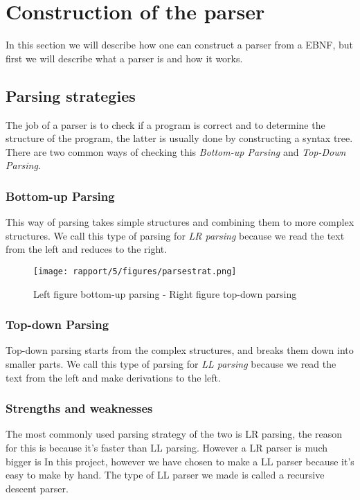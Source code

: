 \section{Construction of the parser}
	In this section we will describe how one can construct a parser from a EBNF, but first we will describe what a parser is and how it works.
	
	\subsection{Parsing strategies}
		The job of a parser is to check if a program is correct and 
		to determine the structure of the program, the latter is usually done by constructing a syntax tree.
		There are two common ways of checking this {\it Bottom-up Parsing} and {\it Top-Down Parsing}.
		
		\subsubsection*{Bottom-up Parsing}
			This way of parsing takes simple structures and combining them to more complex structures.
			We call this type of parsing for {\it LR parsing} because we read the text from the left and reduces to the right.
			\begin{figure}[H]
				\centering
				\texttt{[image: rapport/5/figures/parsestrat.png]}
				\caption{Left figure bottom-up parsing - Right figure top-down parsing}\label{fig:lrparse}
			\end{figure}
			
		\subsubsection*{Top-down Parsing}
			Top-down parsing starts from the complex structures, and breaks them down into smaller parts.
			We call this type of parsing for {\it LL parsing} because we read the text from the left and make derivations to the left.
		
		\subsubsection*{Strengths and weaknesses}
			The most commonly used parsing strategy of the two is LR parsing, the reason for this is because it's faster than LL parsing.
			However a LR parser is much bigger is 
			In this project, however we have chosen to make a LL parser because it's easy to make by hand. The type of LL parser we made is called
			a recursive descent parser.
			
